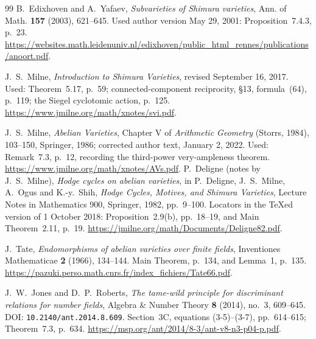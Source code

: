 \documentclass[11pt]{article}
\theoremstyle{definition}
\theoremstyle{remark}
\begin{document}
\begin{thebibliography}{99}
B.~Edixhoven and A.~Yafaev, \emph{Subvarieties of Shimura varieties},
Ann. of Math. \textbf{157} (2003), 621--645.
Used author version May 29, 2001: Proposition~7.4.3, p.~23.
\url{https://websites.math.leidenuniv.nl/edixhoven/public_html_rennes/publications/anoort.pdf}.

J.~S.~Milne, \emph{Introduction to Shimura Varieties},
revised September 16, 2017.
Used: Theorem~5.17, p.~59; connected-component reciprocity,
\S13, formula~(64), p.~119; the Siegel cyclotomic action, p.~125.
\url{https://www.jmilne.org/math/xnotes/svi.pdf}.


J.~S.~Milne, \emph{Abelian Varieties},
Chapter V of \emph{Arithmetic Geometry} (Storrs, 1984),
103--150, Springer, 1986; corrected author text, January 2, 2022.
Used: Remark~7.3, p.~12, recording the third-power very-ampleness theorem.
\url{https://www.jmilne.org/math/xnotes/AVs.pdf}.
P.~Deligne (notes by J.~S.~Milne),
\emph{Hodge cycles on abelian varieties},
in P.~Deligne, J.~S.~Milne, A.~Ogus and K.-y.~Shih,
\emph{Hodge Cycles, Motives, and Shimura Varieties},
Lecture Notes in Mathematics 900, Springer, 1982, pp.~9--100.
Locators in the TeXed version of 1 October 2018:
Proposition~2.9(b), pp.~18--19, and Main Theorem~2.11, p.~19.
\url{https://jmilne.org/math/Documents/Deligne82.pdf}.

J.~Tate,
\emph{Endomorphisms of abelian varieties over finite fields},
Inventiones Mathematicae \textbf{2} (1966), 134--144.
Main Theorem, p.~134, and Lemma~1, p.~135.
\url{https://pazuki.perso.math.cnrs.fr/index_fichiers/Tate66.pdf}.

J.~W.~Jones and D.~P.~Roberts,
\emph{The tame-wild principle for discriminant relations for number fields},
Algebra \& Number Theory \textbf{8} (2014), no.~3, 609--645.
DOI: \texttt{10.2140/ant.2014.8.609}.
Section~3C, equations (3-5)--(3-7), pp.~614--615;
Theorem~7.3, p.~634.
\url{https://msp.org/ant/2014/8-3/ant-v8-n3-p04-p.pdf}.


\end{thebibliography}
\end{document}
